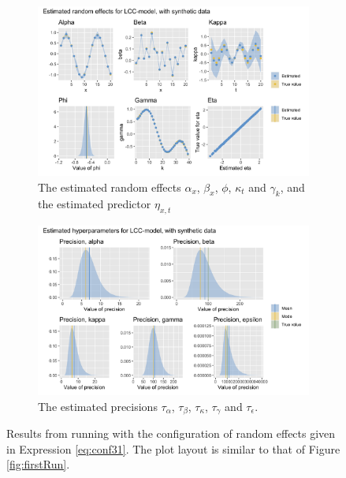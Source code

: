 \begin{figure}[h!]
    \centering
    \begin{subfigure}[b]{0.85\textwidth}
        \centering
        \includegraphics[width=\textwidth]{synthetic-data/Figures/effects-LCC-synthetic-3-1.png}
        \caption{The estimated random effects $\alpha_x$, $\beta_x$, $\phi$, $\kappa_t$ and $\gamma_k$, and the estimated predictor $\eta_{x,t}$}
        \label{fig:conf31-top}
    \end{subfigure}
    
    \begin{subfigure}[b]{0.6\textwidth}
        \centering
        \includegraphics[width=\textwidth]{synthetic-data/Figures/hyperparameters-LCC-synthetic-3-1.png}
        \caption{The estimated precisions $\tau_\alpha$, $\tau_\beta$, $\tau_\kappa$, $\tau_\gamma$ and $\tau_\epsilon$.}
        \label{fig:conf31-bottom}
    \end{subfigure}
    \caption{Results from running \inlabru with the configuration of random effects given in Expression \ref{eq:conf31}. The plot layout is similar to that of Figure \ref{fig:firstRun}.}
    \label{fig:conf31}
\end{figure}

